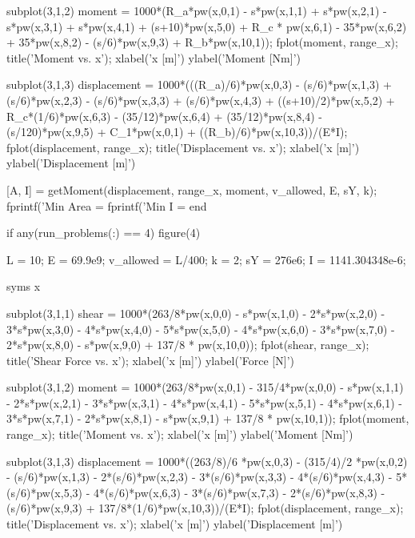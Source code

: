\documentclass[a4paper]{article}
\begin{document}
\begin{verbatim*}
    subplot(3,1,2)
    moment = 1000*(R_a*pw(x,0,1) - s*pw(x,1,1) + s*pw(x,2,1) - s*pw(x,3,1) + s*pw(x,4,1) + (s+10)*pw(x,5,0) + R_c * pw(x,6,1) - 35*pw(x,6,2) + 35*pw(x,8,2) - (s/6)*pw(x,9,3) + R_b*pw(x,10,1));
    fplot(moment, range_x);
    title('Moment vs. x');
    xlabel('x [m]')
    ylabel('Moment [Nm]')

    subplot(3,1,3)
    displacement = 1000*(((R_a)/6)*pw(x,0,3) - (s/6)*pw(x,1,3) + (s/6)*pw(x,2,3) - (s/6)*pw(x,3,3) + (s/6)*pw(x,4,3) + ((s+10)/2)*pw(x,5,2) + R_c*(1/6)*pw(x,6,3) - (35/12)*pw(x,6,4) + (35/12)*pw(x,8,4) - (s/120)*pw(x,9,5) + C_1*pw(x,0,1) + ((R_b)/6)*pw(x,10,3))/(E*I);
    fplot(displacement, range_x);
    title('Displacement vs. x');
    xlabel('x [m]')
    ylabel('Displacement [m]')

    [A, I] = getMoment(displacement, range_x, moment, v_allowed, E, sY, k);
    fprintf('Min Area = %
    fprintf('Min I = %
end


if any(run_problems(:) == 4)
    figure(4)

    L = 10; %
    E = 69.9e9; %
    v_allowed = L/400; %
    k = 2; %
    sY = 276e6; %
    I = 1141.304348e-6; %

    syms x

    subplot(3,1,1)
    shear = 1000*(263/8*pw(x,0,0) - s*pw(x,1,0) - 2*s*pw(x,2,0) - 3*s*pw(x,3,0) - 4*s*pw(x,4,0) - 5*s*pw(x,5,0) - 4*s*pw(x,6,0) - 3*s*pw(x,7,0) - 2*s*pw(x,8,0) - s*pw(x,9,0) + 137/8 * pw(x,10,0));
    fplot(shear, range_x);
    title('Shear Force vs. x');
    xlabel('x [m]')
    ylabel('Force [N]')

    subplot(3,1,2)
    moment = 1000*(263/8*pw(x,0,1) - 315/4*pw(x,0,0) - s*pw(x,1,1) - 2*s*pw(x,2,1) - 3*s*pw(x,3,1) - 4*s*pw(x,4,1) - 5*s*pw(x,5,1) - 4*s*pw(x,6,1) - 3*s*pw(x,7,1) - 2*s*pw(x,8,1) - s*pw(x,9,1) + 137/8 * pw(x,10,1));
    fplot(moment, range_x);
    title('Moment vs. x');
    xlabel('x [m]')
    ylabel('Moment [Nm]')

    subplot(3,1,3)
    displacement = 1000*((263/8)/6 *pw(x,0,3) - (315/4)/2 *pw(x,0,2) - (s/6)*pw(x,1,3) - 2*(s/6)*pw(x,2,3) - 3*(s/6)*pw(x,3,3) - 4*(s/6)*pw(x,4,3) - 5*(s/6)*pw(x,5,3) - 4*(s/6)*pw(x,6,3) - 3*(s/6)*pw(x,7,3) - 2*(s/6)*pw(x,8,3) - (s/6)*pw(x,9,3) + 137/8*(1/6)*pw(x,10,3))/(E*I);
    fplot(displacement, range_x);
    title('Displacement vs. x');
    xlabel('x [m]')
    ylabel('Displacement [m]')


\end{verbatim*}
\end{document}
